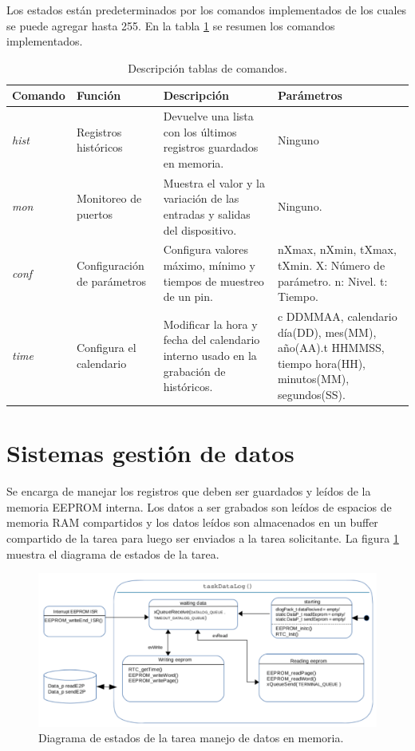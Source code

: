 Los estados están predeterminados por los comandos implementados de los cuales se puede agregar hasta 255. En la tabla \ref{tablas_comandos} se resumen los comandos implementados.

\begin{table}[]
\hspace{-1.5cm}
\begin{flushleft}
\begin{tabular}{|m{1.8cm}|m{3cm}|m{4.5cm}|m{4.5cm}|}\hline
{\textbf{Comando}} & {\textbf{Función}} & {\textbf{Descripción}} & {\textbf{Parámetros}} \\ \hline
{\textit{hist}} & {Registros históricos} & { Devuelve una lista con los últimos registros guardados en memoria.} & {Ninguno} \\ \hline
{\textit{mon}} & {Monitoreo de puertos} & {Muestra el valor y la variación de las entradas y salidas del dispositivo.} & {Ninguno.} \\ \hline
{\textit{conf}} & {Configuración de parámetros} & {Configura valores máximo, mínimo y tiempos de muestreo de un pin.} & {nXmax, nXmin, tXmax, tXmin. X: Número de parámetro. n: Nivel. t: Tiempo.} \\ \hline
{\textit{time}} & {Configura el calendario} & {Modificar la hora y fecha del calendario interno usado en la grabación de históricos.} & {c DDMMAA, calendario día(DD), mes(MM), año(AA).t HHMMSS, tiempo hora(HH), minutos(MM), segundos(SS).} \\ \hline
\end{tabular}
\end{flushleft}
\caption{Descripción tablas de comandos.}
\label{tablas_comandos}
\end{table}


\section{ Sistemas gestión de datos }

Se encarga de manejar los registros que deben ser guardados y leídos de la memoria EEPROM interna. Los datos a ser grabados son leídos de espacios de memoria RAM compartidos y los datos leídos son almacenados en un buffer compartido de la tarea para luego ser enviados a la tarea solicitante.
La figura \ref{fig:diag_TareasLogs} muestra el diagrama de estados de la tarea.

\begin{figure}[]
	\hspace{-1.5cm}
	\includegraphics[width=1.2\textwidth]{Figures/Cap_3/diagrama_tarea_datalog}
	\caption{Diagrama de estados de la tarea manejo de datos en memoria.}
	\label{fig:diag_TareasLogs}
\end{figure}





